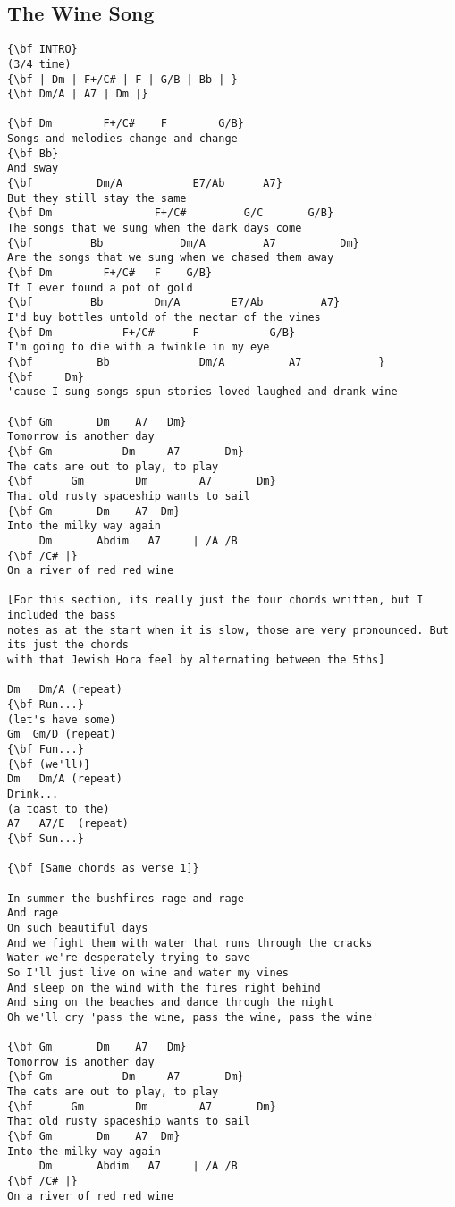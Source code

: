 \documentclass[a4paper]{article}
\begin{document}
\subsection{The Wine Song}
\begin{Verbatim}[commandchars=\\\{\}]
{\bf INTRO}
(3/4 time)
{\bf | Dm | F+/C# | F | G/B | Bb | }
{\bf Dm/A | A7 | Dm |}

{\bf Dm        F+/C#    F        G/B}
Songs and melodies change and change
{\bf Bb}
And sway
{\bf          Dm/A           E7/Ab      A7}
But they still stay the same
{\bf Dm                F+/C#         G/C       G/B}
The songs that we sung when the dark days come
{\bf         Bb            Dm/A         A7          Dm}
Are the songs that we sung when we chased them away
{\bf Dm        F+/C#   F    G/B}
If I ever found a pot of gold
{\bf         Bb        Dm/A        E7/Ab         A7}
I'd buy bottles untold of the nectar of the vines
{\bf Dm           F+/C#      F           G/B}
I'm going to die with a twinkle in my eye
{\bf          Bb              Dm/A          A7            }
{\bf     Dm}
'cause I sung songs spun stories loved laughed and drank wine

{\bf Gm       Dm    A7   Dm}
Tomorrow is another day
{\bf Gm           Dm     A7       Dm}
The cats are out to play, to play
{\bf      Gm        Dm        A7       Dm}
That old rusty spaceship wants to sail
{\bf Gm       Dm    A7  Dm}
Into the milky way again
     Dm       Abdim   A7     | /A /B 
{\bf /C# |}
On a river of red red wine

[For this section, its really just the four chords written, but I included the bass 
notes as at the start when it is slow, those are very pronounced. But its just the chords 
with that Jewish Hora feel by alternating between the 5ths]

Dm   Dm/A (repeat)
{\bf Run...}
(let's have some)
Gm  Gm/D (repeat)
{\bf Fun...}
{\bf (we'll)}
Dm   Dm/A (repeat)
Drink...
(a toast to the)
A7   A7/E  (repeat)
{\bf Sun...}

{\bf [Same chords as verse 1]}

In summer the bushfires rage and rage
And rage
On such beautiful days
And we fight them with water that runs through the cracks
Water we're desperately trying to save
So I'll just live on wine and water my vines
And sleep on the wind with the fires right behind
And sing on the beaches and dance through the night
Oh we'll cry 'pass the wine, pass the wine, pass the wine'

{\bf Gm       Dm    A7   Dm}
Tomorrow is another day
{\bf Gm           Dm     A7       Dm}
The cats are out to play, to play
{\bf      Gm        Dm        A7       Dm}
That old rusty spaceship wants to sail
{\bf Gm       Dm    A7  Dm}
Into the milky way again
     Dm       Abdim   A7     | /A /B 
{\bf /C# |}
On a river of red red wine


\end{Verbatim}
\end{document}
